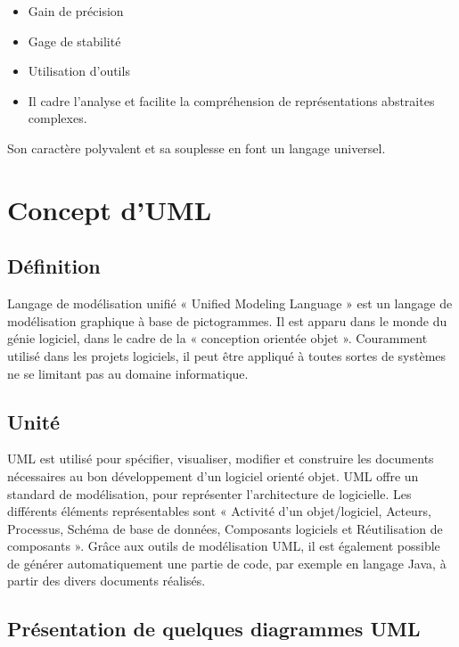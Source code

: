 \begin{itemize}[label=\textbullet, font=\LARGE \color{blue}] 
	\item  Gain de précision
	\item  Gage de stabilité
	\item  Utilisation d'outils
	\item  Il cadre l'analyse et facilite la compréhension de représentations abstraites complexes.
\end{itemize}

Son caractère polyvalent et sa souplesse en font un langage universel.
 

\section{Concept d'UML}

\subsection{Définition}

Langage de modélisation unifié « Unified Modeling Language » est un langage de modélisation graphique à base de pictogrammes. Il est apparu dans le monde du génie logiciel, dans le cadre de la « conception orientée objet ». Couramment utilisé dans les projets logiciels, il peut être appliqué à toutes sortes de systèmes ne se limitant pas au domaine informatique.

\subsection{Unité}

UML est utilisé pour spécifier, visualiser, modifier et construire les documents nécessaires au bon développement d’un logiciel orienté objet. UML offre un standard de modélisation, pour représenter l’architecture de logicielle. Les différents éléments représentables sont « Activité d’un objet/logiciel, Acteurs, Processus, Schéma de base de données, Composants logiciels et Réutilisation de composants ». Grâce aux outils de modélisation UML, il est également possible de générer automatiquement une partie de code, par exemple en langage Java, à partir des divers documents réalisés.

\subsection{Présentation de quelques diagrammes UML}

